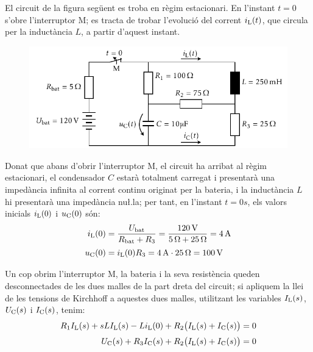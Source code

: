 \begin{exemple}

El circuit de la figura seg\"{u}ent es troba en r\`{e}gim estacionari. En
l'instant $t=0$ s'obre l'interruptor M; es tracta de trobar
l'evoluci\'{o} del corrent $i_\mathrm{L}(t)$, que circula per la induct\`{a}ncia
$L$, a partir d'aquest instant.

\begin{figure}[h]
    \centering
    \includegraphics{Imatges/Cap-Laplace-Exemple3-Circuit.pdf}
\end{figure}

 Donat que abans d'obrir l'interruptor M, el circuit ha arribat al
 r\`{e}gim estacionari, el condensador $C$ estar\`{a} totalment carregat  i
 presentar\`{a} una imped\`{a}ncia infinita al corrent continu originat per la
 bateria, i la induct\`{a}ncia $L$ hi presentar\`{a} una imped\`{a}ncia nu{\l.l}a;
 per tant, en l'instant $t=0\unit{s}$, els valors inicials $i_\mathrm{L}(0)$ i
 $u_\mathrm{C}(0)$ s\'{o}n:
 \begin{align*}
    i_\mathrm{L}(0) &= \frac{U_\mathrm{bat}}{R_\mathrm{bat} + R_3} = \frac{120\mathrm{\,V}}
    {5\mathrm{\,\mathrm{\Omega}} + 25\mathrm{\,\mathrm{\Omega}}} = 4\mathrm{\,A} \\[0.5ex]
    u_\mathrm{C}(0) &= i_\mathrm{L}(0) R_3 = 4\mathrm{\,A}\cdot 25\mathrm{\,\mathrm{\Omega}} = 100\mathrm{\,V}
 \end{align*}

Un cop obrim l'interruptor M, la bateria i la seva resist\`{e}ncia
queden desconnectades de les dues malles de la part dreta del circuit; si apliquem la llei de les tensions de Kirchhoff  a aquestes
dues malles, utilitzant les variables $I_\mathrm{L}(s)$, $U_\mathrm{C}(s)$ i
$I_\mathrm{C}(s)$, tenim:
\begin{align*}
    R_1 I_\mathrm{L}(s) + s L I_\mathrm{L}(s) - L i_\mathrm{L}(0) + R_2
    \bigl(I_\mathrm{L}(s) + I_\mathrm{C}(s)\bigr) &=0 \\[0.5ex]
    U_\mathrm{C}(s) + R_3 I_\mathrm{C}(s) + R_2 \bigl(I_\mathrm{L}(s) + I_\mathrm{C}(s)\bigr) &=0
\end{align*}


\end{exemple}
